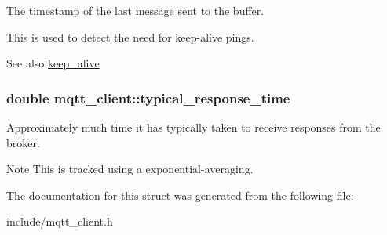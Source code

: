 The timestamp of the last message sent to the buffer. 

This is used to detect the need for keep-\/alive pings.

\begin{DoxySeeAlso}{See also}
\hyperlink{structmqtt__client_aff533344a060e58277698039f547147a}{keep\+\_\+alive} 
\end{DoxySeeAlso}
\subsubsection[{\texorpdfstring{typical\+\_\+response\+\_\+time}{typical_response_time}}]{\setlength{\rightskip}{0pt plus 5cm}double mqtt\+\_\+client\+::typical\+\_\+response\+\_\+time}\hypertarget{structmqtt__client_a4d1f8c7f4c364b07f75efcaf9613150e}{}\label{structmqtt__client_a4d1f8c7f4c364b07f75efcaf9613150e}


Approximately much time it has typically taken to receive responses from the broker. 

\begin{DoxyNote}{Note}
This is tracked using a exponential-\/averaging. 
\end{DoxyNote}


The documentation for this struct was generated from the following file\+:\begin{DoxyCompactItemize}
\item 
include/mqtt\+\_\+client.\+h\end{DoxyCompactItemize}
